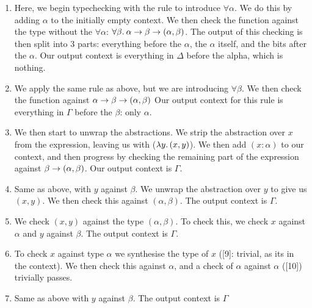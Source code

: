 \begin{enumerate}
    \item Here, we begin typechecking with the \AllIntro rule to introduce $\forall \alpha$. We do this by adding $\alpha$ to the initially empty context. We then check the function against the type without the $\forall \alpha$: $\forall\beta.\:{\alpha \rightarrow \beta \rightarrow (\alpha, \beta)}$. The output of this checking is then split into 3 parts: everything before the $\alpha$, the $\alpha$ itself, and the bits after the $\alpha$. Our output context is everything in $\Delta$ before the alpha, which is nothing. 
    \item We apply the same rule as above, but we are introducing $\forall \beta$. We then check the function against ${\alpha \rightarrow \beta \rightarrow (\alpha, \beta)}$
    Our output context for this rule is everything in $\Gamma$ before the $\beta$: only $\alpha$.
    \item We then start to unwrap the abstractions. We strip the abstraction over $x$ from the expression, leaving us with ($\lambda y.\, (x, y)$). We then add $(x:\alpha)$ to our context, and then progress by checking the remaining part of the expression against ${\beta \rightarrow (\alpha, \beta)}$. Our output context is $\Gamma$. 
    \item Same as above, with $y$ against $\beta$. We unwrap the abstraction over $y$ to give us $(x, y)$. We then check this against ${(\alpha, \beta)}$. The output context is $\Gamma$.
    \item We check $(x, y)$ against the type $(\alpha, \beta)$. To check this, we check $x$ against $\alpha$ and $y$ against $\beta$. The output context is $\Gamma$.
    \item To check $x$ against type $\alpha$ we synthesise the type of $x$ ([9]: trivial, as its in the context). We then check this against $\alpha$, and a check of $\alpha$ against $\alpha$ ([10]) trivially passes.
    \item Same as above with $y$ against $\beta$. The output context is $\Gamma$
\end{enumerate}



